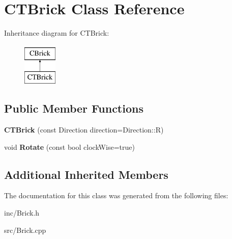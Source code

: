 \hypertarget{classCTBrick}{\section{C\-T\-Brick Class Reference}
\label{classCTBrick}
}
Inheritance diagram for C\-T\-Brick\-:\begin{figure}[H]
\begin{center}
\leavevmode
\includegraphics[height=2.000000cm]{classCTBrick}
\end{center}
\end{figure}
\subsection*{Public Member Functions}
\begin{DoxyCompactItemize}
\item 
\hypertarget{classCTBrick_ac33acf0e990eb86498a35b9c055e2395}{{\bfseries C\-T\-Brick} (const Direction direction=Direction\-::\-R)}\label{classCTBrick_ac33acf0e990eb86498a35b9c055e2395}

\item 
\hypertarget{classCTBrick_ae13cd4cbb5b8305bd5c7b5e6a34a3ad9}{void {\bfseries Rotate} (const bool clock\-Wise=true)}\label{classCTBrick_ae13cd4cbb5b8305bd5c7b5e6a34a3ad9}

\end{DoxyCompactItemize}
\subsection*{Additional Inherited Members}


The documentation for this class was generated from the following files\-:\begin{DoxyCompactItemize}
\item 
inc/Brick.\-h\item 
src/Brick.\-cpp\end{DoxyCompactItemize}
